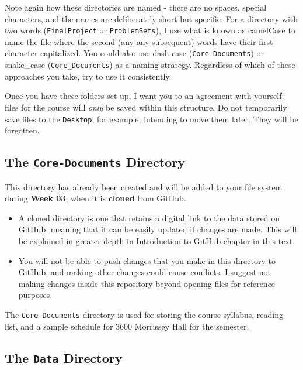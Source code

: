 \documentclass[]{book}
\newenvironment{rmdblock}[1]
  {\begin{shaded*}
  \begin{itemize}
  \renewcommand{\labelitemi}{
    \raisebox{-.7\height}[0pt][0pt]{
      {\setkeys{Gin}{width=3em,keepaspectratio}\texttt{[image: images/\#1]}}
    }
  }
  \item
  }
  {
  \end{itemize}
  \end{shaded*}
  }
\newenvironment{rmdnote}
  {\begin{rmdblock}{note}}
  {\end{rmdblock}}
\newenvironment{rmdwarning}
  {\begin{rmdblock}{warning}}
  {\end{rmdblock}}
\theoremstyle{definition}
\theoremstyle{definition}
\theoremstyle{definition}
\theoremstyle{remark}
\begin{document}
Note again how these directories are named - there are no spaces,
special characters, and the names are deliberately short but specific.
For a directory with two words (\texttt{FinalProject} or
\texttt{ProblemSets}), I use what is known as camelCase to name the file
where the second (any any subsequent) words have their first character
capitalized. You could also use dash-case (\texttt{Core-Documents}) or
snake\_case (\texttt{Core\_Documents}) as a naming strategy. Regardless
of which of these approaches you take, try to use it consistently.

Once you have these folders set-up, I want you to an agreement with
yourself: files for the course will \emph{only} be saved within this
structure. Do not temporarily save files to the \texttt{Desktop}, for
example, intending to move them later. They will be forgotten.

\subsection{\texorpdfstring{The \texttt{Core-Documents}
Directory}{The Core-Documents Directory}}\label{the-core-documents-directory}

This directory has already been created and will be added to your file
system during \textbf{Week 03}, when it is \textbf{cloned} from GitHub.

\begin{rmdnote}
A cloned directory is one that retains a digital link to the data stored
on GitHub, meaning that it can be easily updated if changes are made.
This will be explained in greater depth in Introduction to GitHub
chapter in this text.
\end{rmdnote}

\begin{rmdwarning}
You will not be able to push changes that you make in this directory to
GitHub, and making other changes could cause conflicts. I suggest not
making changes inside this repository beyond opening files for reference
purposes.
\end{rmdwarning}

The \texttt{Core-Documents} directory is used for storing the course
syllabus, reading list, and a sample schedule for 3600 Morrissey Hall
for the semester.

\subsection{\texorpdfstring{The \texttt{Data}
Directory}{The Data Directory}}\label{the-data-directory}
\end{document}
